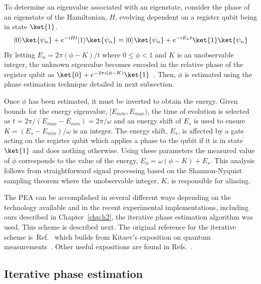 \documentclass[11pt,oneside,final]{huthesis}%
\begin{document}
To determine an eigenvalue associated with an eigenstate, consider the phase of an eigenstate of the Hamiltonian, $H$, evolving dependent on a register qubit being in state $\ket{1}$.
\begin{equation}
	|0\rangle\ket{\psi_n}+e^{-iHt}|1\rangle\ket{\psi_n}=|0\rangle\ket{\psi_n}+e^{-iE_{n}t}\ket{1}\ket{\psi_n}
	\label{eqn:SE}
\end{equation}
By letting $E_{n}=2\pi(\phi-K)/t$ where $0\leq\phi<1$ and $K$ is an unobservable integer,
the unknown eigenvalue becomes encoded in the relative phase of the register qubit as $\ket{0}+e^{-2\pi i(\phi-K)}\ket{1}$~\cite{Parker00,Aspuru05,Kitaev95}.  Then, $\phi$ is estimated using the phase estimation technique detailed in next subsection.

Once $\phi$ has been estimated, it must be inverted to obtain the energy. Given bounds for the energy eigenvalue, $[E_{min},E_{max})$, the time of evolution is selected as $t=2\pi/(E_{max}-E_{min})=2\pi/\omega$  and an energy shift of $E_s$ is used to ensure $K=(E_s-E_{min})/\omega$ is an integer. %
The energy shift, $E_s$, is affected by a gate acting on the register qubit which applies a phase to the qubit if it is in state $\ket{1}$ and does nothing otherwise. Using these parameters the measured value of $\phi$ corresponds to the value of the energy, $E_\phi=\omega(\phi -K)+E_s$.  This analysis follows from straightforward signal processing based on the Shannon-Nyquist sampling theorem where the unobservable integer, $K$, is responsible for aliasing.  %

The PEA can be accomplished in several different ways depending on the technology available and in the recent experimental implementations, including ours described in Chapter~\ref{chp:h2}, the iterative phase estimation algorithm was used.  This scheme is described next. The original reference for the iterative scheme is~Ref.~\cite{Parker00} which builds from Kitaev's exposition on quantum measurements~\cite{Kitaev95}. Other useful expositions are found in Refs.~\cite{Tomita06,Dobsicek07,Xiu07,Knill07}.

\subsection{Iterative phase estimation}\label{ssec:ipea}
\end{document}
